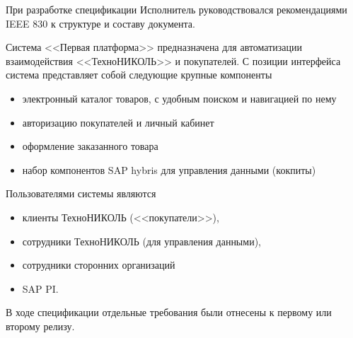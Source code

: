 %



При разработке спецификации Исполнитель руководствовался рекомендациями IEEE 830 к структуре и составу документа.


Система <<Первая платформа>> предназначена для автоматизации взаимодействия <<ТехноНИКОЛЬ>> и покупателей. С позиции интерфейса система представляет собой следующие крупные компоненты 
\begin{itemize}
\item электронный каталог товаров, с удобным поиском и навигацией по нему 
\item авторизацию покупателей и личный кабинет
\item оформление заказанного товара
\item набор компонентов SAP hybris для управления данными (кокпиты)
\end{itemize}


Пользователями системы являются 
\begin{itemize}
\item клиенты ТехноНИКОЛЬ (<<покупатели>>), 
\item сотрудники ТехноНИКОЛЬ (для управления данными),
\item сотрудники сторонних организаций
\item SAP PI.
\end{itemize}


В ходе спецификации отдельные требования были отнесены к первому или второму релизу. 